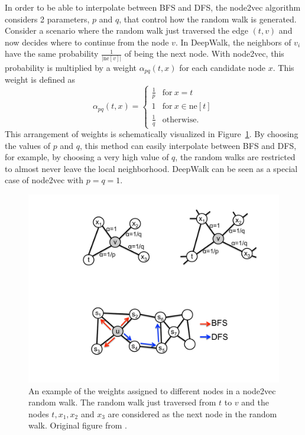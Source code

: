 In order to be able to interpolate between BFS and DFS, the node2vec algorithm considers 2 parameters, \( p \) and \( q \), that control how the random walk is generated. Consider a scenario where the random walk just traversed the edge \( \left( t, v \right) \) and now decides where to continue from the node \( v \). In DeepWalk, the neighbors of \( v_i \) have the same probability \( \frac{1}{\left\lvert \mathrm{ne}[v] \right\rvert} \) of being the next node. With node2vec, this probability is multiplied by a weight \( \alpha_{pq} \left( t, x \right) \) for each candidate node \( x \). This weight is defined as
\begin{equation}\label{node2vec-weight}
	\alpha_{pq} \left( t, x \right) = \begin{cases}
		\frac{1}{p} & \text{for}\ x = t \\
		1 & \text{for}\ x \in \mathrm{ne}[t] \\
		\frac{1}{q} & \text{otherwise.}
	\end{cases}
\end{equation}
This arrangement of weights is schematically visualized in Figure~\ref{fig:node2vec-weights}. By choosing the values of \( p \) and \( q \), this method can easily interpolate between BFS and DFS, for example, by choosing a very high value of \( q \), the random walks are restricted to almost never leave the local neighborhood. DeepWalk can be seen as a special case of node2vec with \( p = q = 1 \).

\begin{figure}
	\includegraphics[width=0.6\linewidth]{images/node2vec-weights.pdf}
	\caption{An example of the weights assigned to different nodes in a node2vec random walk. The random walk just traversed from \( t \) to \( v \) and the nodes \( t, x_1, x_2 \) and \( x_3 \) are considered as the next node in the random walk. Original figure from \cite{grover_node2vec_2016}.}
	\label{fig:node2vec-weights}
\end{figure}


